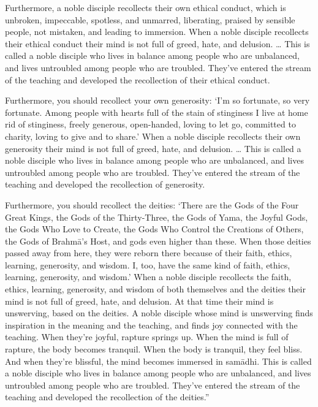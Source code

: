 \documentclass[12pt,openany]{book}%
\begin{document}
Furthermore, a noble disciple recollects their own ethical conduct, which is unbroken, impeccable, spotless, and unmarred, liberating, praised by sensible people, not mistaken, and leading to immersion. When a noble disciple recollects their ethical conduct their mind is not full of greed, hate, and delusion. … This is called a noble disciple who lives in balance among people who are unbalanced, and lives untroubled among people who are troubled. They’ve entered the stream of the teaching and developed the recollection of their ethical conduct. 

Furthermore, you should recollect your own generosity: ‘I’m so fortunate, so very fortunate. Among people with hearts full of the stain of stinginess I live at home rid of stinginess, freely generous, open-handed, loving to let go, committed to charity, loving to give and to share.’ When a noble disciple recollects their own generosity their mind is not full of greed, hate, and delusion. … This is called a noble disciple who lives in balance among people who are unbalanced, and lives untroubled among people who are troubled. They’ve entered the stream of the teaching and developed the recollection of generosity. 

Furthermore, you should recollect the deities: ‘There are the Gods of the Four Great Kings, the Gods of the Thirty-Three, the Gods of Yama, the Joyful Gods, the Gods Who Love to Create, the Gods Who Control the Creations of Others, the Gods of \textsanskrit{Brahmā}’s Host, and gods even higher than these. When those deities passed away from here, they were reborn there because of their faith, ethics, learning, generosity, and wisdom. I, too, have the same kind of faith, ethics, learning, generosity, and wisdom.’ When a noble disciple recollects the faith, ethics, learning, generosity, and wisdom of both themselves and the deities their mind is not full of greed, hate, and delusion. At that time their mind is unswerving, based on the deities. A noble disciple whose mind is unswerving finds inspiration in the meaning and the teaching, and finds joy connected with the teaching. When they’re joyful, rapture springs up. When the mind is full of rapture, the body becomes tranquil. When the body is tranquil, they feel bliss. And when they’re blissful, the mind becomes immersed in \textsanskrit{samādhi}. This is called a noble disciple who lives in balance among people who are unbalanced, and lives untroubled among people who are troubled. They’ve entered the stream of the teaching and developed the recollection of the deities.” 
\end{document}
